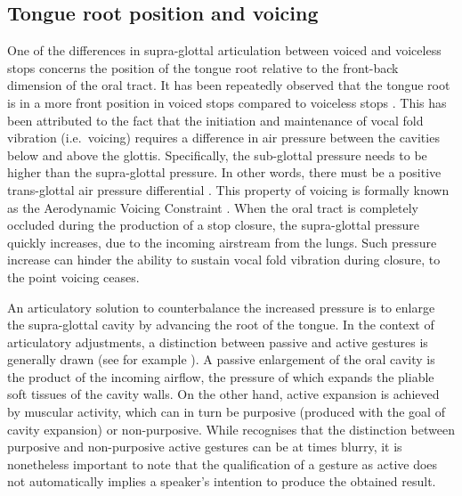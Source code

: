 \documentclass[
  12pt,
]{article}
\begin{document}
\hypertarget{tongue-root-position-and-voicing}{%
\subsection{Tongue root position and
voicing}\label{tongue-root-position-and-voicing}}

One of the differences in supra-glottal articulation between voiced and
voiceless stops concerns the position of the tongue root relative to the
front-back dimension of the oral tract. It has been repeatedly observed
that the tongue root is in a more front position in voiced stops
compared to voiceless stops \citep{kent1969, perkell1969, westbury1983}.
This has been attributed to the fact that the initiation and maintenance
of vocal fold vibration (i.e.~voicing) requires a difference in air
pressure between the cavities below and above the glottis. Specifically,
the sub-glottal pressure needs to be higher than the supra-glottal
pressure. In other words, there must be a positive trans-glottal air
pressure differential \citep{berg1958, rothenberg1967}. This property of
voicing is formally known as the Aerodynamic Voicing Constraint
\citep{ohala2011}. When the oral tract is completely occluded during the
production of a stop closure, the supra-glottal pressure quickly
increases, due to the incoming airstream from the lungs. Such pressure
increase can hinder the ability to sustain vocal fold vibration during
closure, to the point voicing ceases.

An articulatory solution to counterbalance the increased pressure is to
enlarge the supra-glottal cavity by advancing the root of the tongue. In
the context of articulatory adjustments, a distinction between passive
and active gestures is generally drawn (see for example
\citealt{rothenberg1967}). A passive enlargement of the oral cavity is
the product of the incoming airflow, the pressure of which expands the
pliable soft tissues of the cavity walls. On the other hand, active
expansion is achieved by muscular activity, which can in turn be
purposive (produced with the goal of cavity expansion) or non-purposive.
While \citet{rothenberg1967} recognises that the distinction between
purposive and non-purposive active gestures can be at times blurry, it
is nonetheless important to note that the qualification of a gesture as
active does not automatically implies a speaker's intention to produce
the obtained result.
\end{document}
